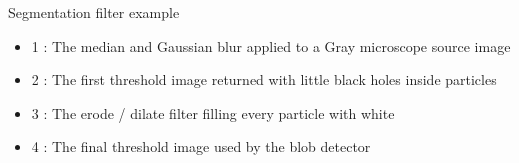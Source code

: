 Segmentation filter example
\begin{itemize}
\item 1 : The median and Gaussian blur applied to a Gray microscope source image
\item 2 : The first threshold image returned with little black holes inside particles
\item 3 : The erode / dilate filter filling every particle with white
\item 4 : The final threshold image used by the blob detector
\end{itemize}
    